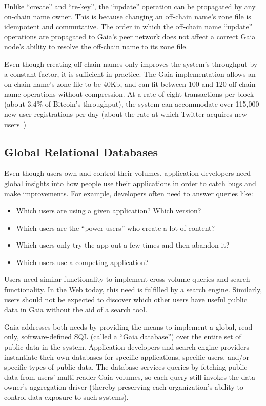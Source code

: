 Unlike ``create'' and ``re-key'', the ``update'' operation can be propagated by
any on-chain name owner.  This is because changing an off-chain name's zone file
is idempotent and commutative.  The order in which the off-chain name ``update''
operations are propagated to Gaia's peer network does not affect a correct
Gaia node's ability to resolve the off-chain name to its zone file.

Even though creating off-chain names only improves the system's throughput by 
a constant factor, it is sufficient in practice.  The Gaia implementation
allows an on-chain name's zone file to be 40Kb, and can fit between
100 and 120 off-chain name operations without compression.
At a rate of eight transactions per block (about 3.4\% of Bitcoin's throughput),
the system can accommodate over 115,000 new user registrations
per day (about the rate at which Twitter acquires
new users~\cite{twitter-user-acquisition})  %

\subsection{Global Relational Databases}

Even though users own and control their volumes, 
application developers need global insights into how people use their
applications in order to catch bugs and make improvements. 
For example, developers often need to answer queries like:

\begin{itemize}
   \item Which users are using a given application?  Which version?
   \item Which users are the ``power users'' who create a lot of content?
   \item Which users only try the app out a few times and then abandon it?
   \item Which users use a competing application?
\end{itemize}

Users need similar functionality to implement cross-volume queries and search
functionality.  In the Web today, this need is fulfilled by a search engine.
Similarly, users should not be expected to discover which other users have
useful public data in Gaia without the aid of a search tool.

Gaia addresses both needs by providing the means to 
implement a global, read-only, software-defined SQL (called a ``Gaia
database'') over the entire set of public data in the system.  Application developers and search
engine providers instantiate their own databases for specific
applications, specific users, and/or specific
types of public data.  The database services queries by fetching
public data from users' multi-reader Gaia volumes, so each query still 
invokes the data owner's aggregation driver (thereby preserving each
organization's ability to control data exposure to such systems).

